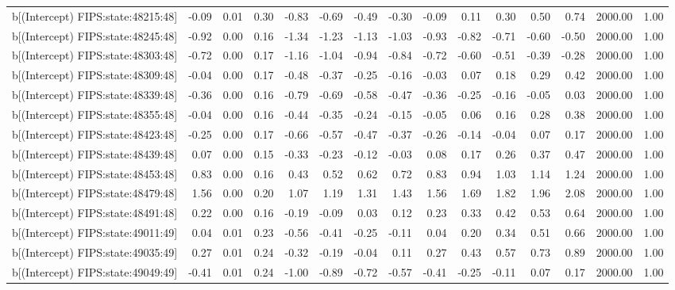 \begin{table}[ht]
\begin{tabular}{rrrrrrrrrrrrrrr}
  b[(Intercept) FIPS:state:48215:48] & -0.09 & 0.01 & 0.30 & -0.83 & -0.69 & -0.49 & -0.30 & -0.09 & 0.11 & 0.30 & 0.50 & 0.74 & 2000.00 & 1.00 \\ 
  b[(Intercept) FIPS:state:48245:48] & -0.92 & 0.00 & 0.16 & -1.34 & -1.23 & -1.13 & -1.03 & -0.93 & -0.82 & -0.71 & -0.60 & -0.50 & 2000.00 & 1.00 \\ 
  b[(Intercept) FIPS:state:48303:48] & -0.72 & 0.00 & 0.17 & -1.16 & -1.04 & -0.94 & -0.84 & -0.72 & -0.60 & -0.51 & -0.39 & -0.28 & 2000.00 & 1.00 \\ 
  b[(Intercept) FIPS:state:48309:48] & -0.04 & 0.00 & 0.17 & -0.48 & -0.37 & -0.25 & -0.16 & -0.03 & 0.07 & 0.18 & 0.29 & 0.42 & 2000.00 & 1.00 \\ 
  b[(Intercept) FIPS:state:48339:48] & -0.36 & 0.00 & 0.16 & -0.79 & -0.69 & -0.58 & -0.47 & -0.36 & -0.25 & -0.16 & -0.05 & 0.03 & 2000.00 & 1.00 \\ 
  b[(Intercept) FIPS:state:48355:48] & -0.04 & 0.00 & 0.16 & -0.44 & -0.35 & -0.24 & -0.15 & -0.05 & 0.06 & 0.16 & 0.28 & 0.38 & 2000.00 & 1.00 \\ 
  b[(Intercept) FIPS:state:48423:48] & -0.25 & 0.00 & 0.17 & -0.66 & -0.57 & -0.47 & -0.37 & -0.26 & -0.14 & -0.04 & 0.07 & 0.17 & 2000.00 & 1.00 \\ 
  b[(Intercept) FIPS:state:48439:48] & 0.07 & 0.00 & 0.15 & -0.33 & -0.23 & -0.12 & -0.03 & 0.08 & 0.17 & 0.26 & 0.37 & 0.47 & 2000.00 & 1.00 \\ 
  b[(Intercept) FIPS:state:48453:48] & 0.83 & 0.00 & 0.16 & 0.43 & 0.52 & 0.62 & 0.72 & 0.83 & 0.94 & 1.03 & 1.14 & 1.24 & 2000.00 & 1.00 \\ 
  b[(Intercept) FIPS:state:48479:48] & 1.56 & 0.00 & 0.20 & 1.07 & 1.19 & 1.31 & 1.43 & 1.56 & 1.69 & 1.82 & 1.96 & 2.08 & 2000.00 & 1.00 \\ 
  b[(Intercept) FIPS:state:48491:48] & 0.22 & 0.00 & 0.16 & -0.19 & -0.09 & 0.03 & 0.12 & 0.23 & 0.33 & 0.42 & 0.53 & 0.64 & 2000.00 & 1.00 \\ 
  b[(Intercept) FIPS:state:49011:49] & 0.04 & 0.01 & 0.23 & -0.56 & -0.41 & -0.25 & -0.11 & 0.04 & 0.20 & 0.34 & 0.51 & 0.66 & 2000.00 & 1.00 \\ 
  b[(Intercept) FIPS:state:49035:49] & 0.27 & 0.01 & 0.24 & -0.32 & -0.19 & -0.04 & 0.11 & 0.27 & 0.43 & 0.57 & 0.73 & 0.89 & 2000.00 & 1.00 \\ 
  b[(Intercept) FIPS:state:49049:49] & -0.41 & 0.01 & 0.24 & -1.00 & -0.89 & -0.72 & -0.57 & -0.41 & -0.25 & -0.11 & 0.07 & 0.17 & 2000.00 & 1.00 \\ 

\end{tabular}
\end{table}
